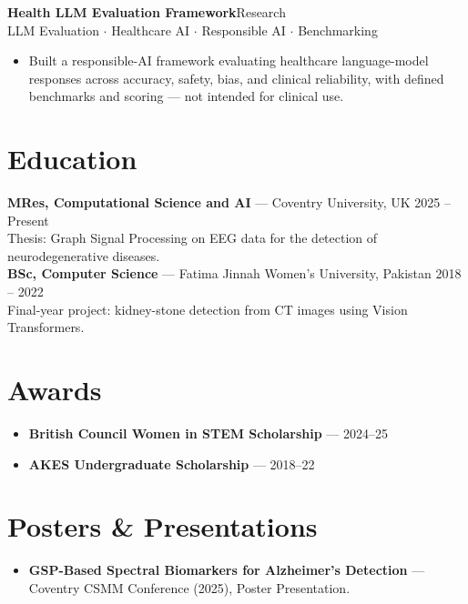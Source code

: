 \documentclass[a4paper,10pt]{article}
\newcommand{\entry}[4]{%
  \noindent\textbf{#1}\hfill{\color{muted}\small #2}\\[-0.2em]
  {\color{accent}\small #3}\\[0.1em]
  #4
}
\begin{document}
\entry{Health LLM Evaluation Framework}
      {Research}
      {LLM Evaluation $\cdot$ Healthcare AI $\cdot$ Responsible AI $\cdot$ Benchmarking}
      {\begin{itemize}
        \item Built a responsible-AI framework evaluating healthcare language-model responses
              across accuracy, safety, bias, and clinical reliability, with defined benchmarks
              and scoring --- not intended for clinical use.
      \end{itemize}}

\section*{Education}
\textbf{MRes, Computational Science and AI} --- Coventry University, UK \hfill {\color{muted}\small 2025 -- Present}\\
{\color{muted}\small Thesis: Graph Signal Processing on EEG data for the detection of neurodegenerative diseases.}\\[0.4em]
\textbf{BSc, Computer Science} --- Fatima Jinnah Women's University, Pakistan \hfill {\color{muted}\small 2018 -- 2022}\\
{\color{muted}\small Final-year project: kidney-stone detection from CT images using Vision Transformers.}

\section*{Awards}
\begin{itemize}
  \item \textbf{British Council Women in STEM Scholarship} --- 2024--25
  \item \textbf{AKES Undergraduate Scholarship} --- 2018--22
\end{itemize}

\section*{Posters \& Presentations}
\begin{itemize}
  \item \textbf{GSP-Based Spectral Biomarkers for Alzheimer's Detection} --- Coventry CSMM
        Conference (2025), Poster Presentation.
\end{itemize}
\end{document}
